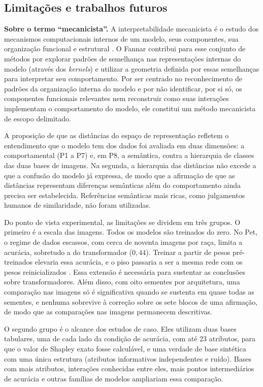 \subsection{Limitações e trabalhos futuros}\label{subsec:res_limitacoes}

\noindent\textbf{Sobre o termo ``mecanicista''.} A interpretabilidade mecanicista é o estudo dos mecanismos computacionais internos de um modelo, seus componentes, sua organização funcional e estrutural \citep{Kastner2024}. O Fannar contribui para esse conjunto de métodos por explorar padrões de semelhança nas representações internas do modelo (através dos \textit{kernels}) e utilizar a geometria definida por essas semelhanças para interpretar seu comportamento. Por ser centrado no reconhecimento de padrões da organização interna do modelo e por não identificar, por si só, os componentes funcionais relevantes nem reconstruir como suas interações implementam o comportamento do modelo, ele constitui um método mecanicista de escopo delimitado.

A proposição de que as distâncias do espaço de representação refletem o entendimento que o modelo tem dos dados foi avaliada em duas dimensões: a comportamental (P1 a P7) e, em P8, a semântica, contra a hierarquia de classes das duas bases de imagens. Na segunda, a hierarquia das distâncias não excede a que a confusão do modelo já expressa, de modo que a afirmação de que as distâncias representam diferenças semânticas além do comportamento ainda precisa ser estabelecida. Referências semânticas mais ricas, como julgamentos humanos de similaridade, não foram utilizadas.

Do ponto de vista experimental, as limitações se dividem em três grupos. O primeiro é a escala das imagens. Todos os modelos são treinados do zero. No Pet, o regime de dados escassos, com cerca de noventa imagens por raça, limita a acurácia, sobretudo a do transformador ($0{,}44$). Treinar a partir de pesos pré-treinados elevaria essa acurácia, e o piso passaria a ser a mesma rede com os pesos reinicializados \citep{Adebayo2018}. Essa extensão é necessária para sustentar as conclusões sobre transformadores. Além disso, com oito sementes por arquitetura, uma comparação nas imagens só é significativa quando se sustenta em quase todas as sementes, e nenhuma sobrevive à correção sobre os sete blocos de uma afirmação, de modo que as comparações nas imagens permanecem descritivas.

O segundo grupo é o alcance dos estudos de caso. Eles utilizam duas bases tabulares, uma de cada lado da condição de acurácia, com até 23 atributos, para que o valor de Shapley exato fosse calculável, e uma verdade de base sintética com uma única estrutura (atributos informativos independentes e ruído). Bases com mais atributos, interações conhecidas entre eles, mais pontos intermediários de acurácia e outras famílias de modelos ampliariam essa comparação.

